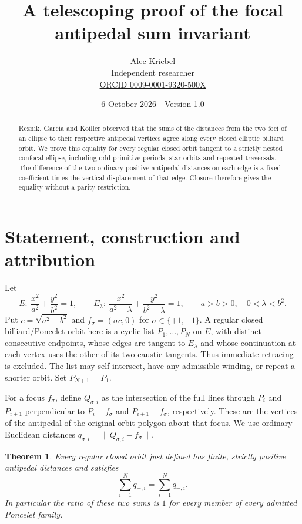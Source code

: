 \documentclass[10pt]{article}
\title{A telescoping proof of the focal antipedal sum invariant}
\author{Alec Kriebel\\Independent researcher\\
  \small\href{https://orcid.org/0009-0001-9320-500X}{ORCID 0009-0001-9320-500X}}
\date{6 October 2026\quad---\quad Version 1.0}
\newtheorem{theorem}{Theorem}
\begin{document}
\maketitle
\begin{abstract}
Reznik, Garcia and Koiller observed that the sums of the distances from
the two foci of an ellipse to their respective antipedal vertices agree
along every closed elliptic billiard orbit. We prove this equality for
every regular closed orbit tangent to a strictly nested confocal ellipse,
including odd primitive periods, star orbits and repeated traversals.
The difference of the two ordinary positive antipedal distances on each
edge is a fixed coefficient times the vertical displacement of that edge.
Closure therefore gives the equality without a parity restriction.
\end{abstract}

\section{Statement, construction and attribution}
Let
\[
 E:\ \frac{x^2}{a^2}+\frac{y^2}{b^2}=1,\qquad
 E_\lambda:\ \frac{x^2}{a^2-\lambda}
                  +\frac{y^2}{b^2-\lambda}=1,
 \qquad a>b>0,\quad 0<\lambda<b^2.
\]
Put $c=\sqrt{a^2-b^2}$ and $f_\sigma=(\sigma c,0)$ for
$\sigma\in\{+1,-1\}$. A regular closed billiard/Poncelet orbit here is a
cyclic list $P_1,\ldots,P_N$ on $E$, with distinct consecutive endpoints,
whose edges are tangent to $E_\lambda$ and whose continuation at each
vertex uses the other of its two caustic tangents. Thus immediate
retracing is excluded. The list may self-intersect, have any admissible
winding, or repeat a shorter orbit. Set $P_{N+1}=P_1$.

For a focus $f_\sigma$, define $Q_{\sigma,i}$ as the intersection of
the full lines through $P_i$ and $P_{i+1}$ perpendicular to
$P_i-f_\sigma$ and $P_{i+1}-f_\sigma$, respectively. These are the
vertices of the antipedal of the original orbit polygon about that focus.
We use ordinary Euclidean distances
$q_{\sigma,i}=\lVert Q_{\sigma,i}-f_\sigma\rVert$.

\begin{theorem}\label{thm:main}
Every regular closed orbit just defined has finite, strictly positive
antipedal distances and satisfies
\begin{equation}\label{eq:sum}
 \sum_{i=1}^N q_{+,i}=\sum_{i=1}^N q_{-,i}.
\end{equation}
In particular the ratio of these two sums is $1$ for every member of
every admitted Poncelet family.
\end{theorem}
\end{document}
